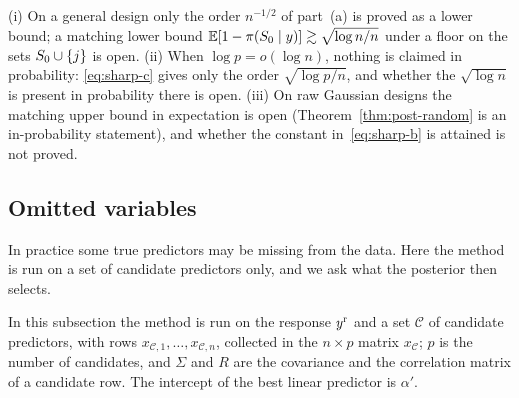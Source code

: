 \begin{remark}\label{rem:sharp-not}
(i) On a general design only the order $n^{-1/2}$ of part~(a) is proved as a lower bound; a matching lower bound
$\operatorname{\mathbb{E}}[1-\pi(S_0\mid y)]\gtrsim\sqrt{\log n/n}$ under a floor on the sets $S_0\cup\{j\}$ is open.
(ii) When $\log p=o(\log n)$, nothing is claimed in probability: \eqref{eq:sharp-c} gives only the order
$\sqrt{\log p/n}$, and whether the $\sqrt{\log n}$ is present in probability there is open.
(iii) On raw Gaussian designs the matching upper bound in expectation is open (Theorem~\ref{thm:post-random} is an
in-probability statement), and whether the constant in~\eqref{eq:sharp-b} is attained is not proved.
\end{remark}

\subsection{Omitted variables}\label{sec:omitted}

In practice some true predictors may be missing from the data. Here the method is run on a set of candidate predictors
only, and we ask what the posterior then selects.


In this subsection the method is run on the response $y^{\mathrm r}$ and a set $\mathcal C$ of candidate predictors, with rows
$x_{\mathcal C,1},\dots,x_{\mathcal C,n}$, collected in the $n\times p$ matrix $x_{\mathcal C}$; $p$ is the number of
candidates, and $\Sigma$ and $R$ are the covariance and the correlation matrix of a candidate row. The intercept of the
best linear predictor is $\alpha'$.

